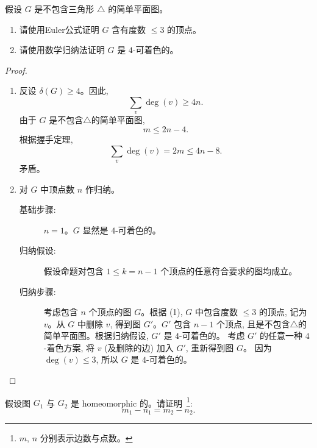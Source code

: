 \documentclass[a4paper, justified]{tufte-handout}
\begin{document}
\begin{problem}
  假设 $G$ 是不包含三角形 $\triangle$ 的简单平面图。
  \begin{enumerate}[(1)]
    \item 请使用Euler公式证明 $G$ 含有度数 $\le 3$ 的顶点。
    \item 请使用数学归纳法证明 $G$ 是 $4$-可着色的。
  \end{enumerate}
\end{problem}

\begin{proof}
  \begin{enumerate}[(1)]
    \item 反设 $\delta(G) \ge 4$。因此,
      \[
        \sum_{v} \deg(v) \ge 4n.
      \]
      由于 $G$ 是不包含$\triangle$的简单平面图,
      \[
        m \le 2n - 4.
      \]
      根据握手定理,
      \[
        \sum_{v} \deg(v) = 2m \le 4n - 8.
      \]
      矛盾。
    \item 对 $G$ 中顶点数 $n$ 作归纳。
      \begin{description}
        \item[基础步骤:] $n = 1$。$G$ 显然是 $4$-可着色的。
        \item[归纳假设:] 假设命题对包含 $1 \le k = n-1$ 个顶点的任意符合要求的图均成立。
        \item[归纳步骤:] 考虑包含 $n$ 个顶点的图 $G$。根据 (1), $G$ 中包含度数 $\le 3$
          的顶点, 记为 $v$。从 $G$ 中删除 $v$, 得到图 $G'$。$G'$ 包含 $n-1$ 个顶点,
          且是不包含$\triangle$的简单平面图。根据归纳假设, $G'$ 是 $4$-可着色的。
          考虑 $G'$ 的任意一种 $4$-着色方案, 将 $v$ (及删除的边) 加入 $G'$, 重新得到图 $G$。
          因为 $\deg(v) \le 3$, 所以 $G$ 是 $4$-可着色的。
      \end{description}
  \end{enumerate}
\end{proof}

\begin{problem}
  假设图 $G_{1}$ 与 $G_{2}$ 是 homeomorphic 的。请证明~\footnote{
    $m$, $n$ 分别表示边数与点数。
  }:
  \[
    m_{1} - n_{1} = m_{2} - n_{2}.
  \]
\end{problem}
\end{document}
